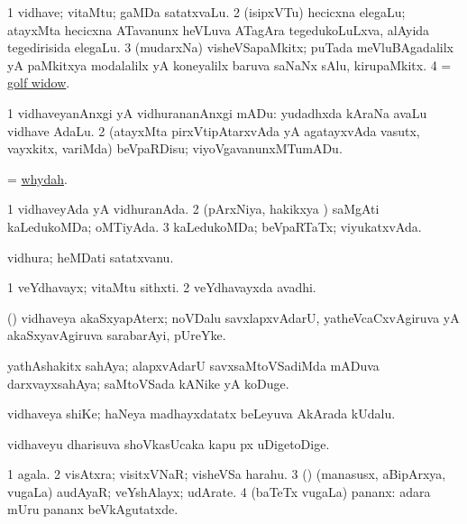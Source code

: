 \bentry
{} 
\gl{\nA}
\expl{}
\bmng
\bnum
\num{1} vidhave; vitaMtu; gaMDa satatxvaLu. 
\num{2} (isipxVTu) hecicxna elegaLu; atayxMta hecicxna ATavanunx heVLuva ATagAra tegedukoLuLxva, alAyida tegedirisida elegaLu. 
\num{3} (mudarxNa) visheVSapaMkitx; puTada meVluBAgadalilx yA paMkitxya modalalilx yA koneyalilx baruva saNaNx sAlu, kirupaMkitx. 
\num{4} = \hyperref{kandict_g.pdf}{G}{golf widow}{golf widow}. 
\enum
\emng
\eentry

\bentry
{} 
\gl{\sakirx}
\bmng
\bnum
\num{1} vidhaveyanAnxgi yA vidhurananAnxgi mADu:  yudadhxda kAraNa avaLu vidhave AdaLu. 
\num{2} (atayxMta pirxVtipAtarxvAda yA agatayxvAda vasutx, vayxkitx, \mo variMda) beVpaRDisu; viyoVgavanunxMTumADu. 
\enum
\emng
\eentry

\bentry
{}
\gl{\nA}
\bmng
= \hyperlink{whydah}{whydah}. 
\emng
\eentry

\bentry
{}
\gl{\gu}
\bmng
\bnum
\num{1} vidhaveyAda yA vidhuranAda. 
\num{2} (pArxNiya, hakikxya \vi) saMgAti kaLedukoMDa; oMTiyAda. 
\num{3} kaLedukoMDa; beVpaRTaTx; viyukatxvAda. 
\enum
\emng
\eentry

\bentry
{}
\gl{\nA}
\bmng
vidhura; heMDati satatxvanu. 
\emng
\eentry

\bentry
{}
\gl{\nA}
\bmng
\bnum
\num{1} veYdhavayx; vitaMtu sithxti.
\num{2} veYdhavayxda avadhi. 
\enum
\emng
\eentry

\bentry
{}
\gl{\nA}
\bmng
(\beY) vidhaveya akaSxyapAterx; noVDalu savxlapxvAdarU, yatheVcaCxvAgiruva yA akaSxyavAgiruva sarabarAyi, pUreYke. 
\emng
\eentry

\bentry
{}
\gl{\nA}
\bmng
yathAshakitx sahAya; alapxvAdarU savxsaMtoVSadiMda mADuva darxvayxsahAya; saMtoVSada kANike yA koDuge. 
\emng
\eentry

\bentry
{}
\gl{\nA}
\bmng
vidhaveya shiKe; haNeya madhayxdatatx beLeyuva  AkArada kUdalu. 
\emng
\eentry

\bentry
{}
\gl{\nA}
\bmng
vidhaveyu dharisuva shoVkasUcaka kapu px uDigetoDige. 
\emng
\eentry

\bentry
{} 
\gl{\nA}
\expl{}
\bmng
\bnum
\num{1} agala. 
\num{2} visAtxra; visitxVNaR; visheVSa harahu. 
\num{3} (\rUpa) (manasusx, aBipArxya, \mo vugaLa) audAyaR; veYshAlayx; udArate. 
\num{4} (baTeTx \mo vugaLa) pananx:  adara mUru pananx beVkAgutatxde. 
\enum
\emng
\eentry

